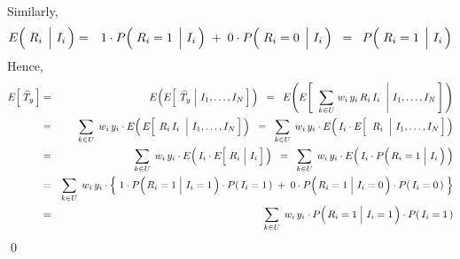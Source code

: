 Similarly,
\begin{eqnarray*}
E\!\left(\,\left.\overset{{\color{white}.}}{R_{i}}\;\,\right\vert\,I_{i}\,\right)
& = &
	1 \cdot P\!\left(\,\left.\overset{{\color{white}.}}{R_{i}}=1\;\,\right\vert\,I_{i}\,\right)
	\; + \;
	0 \cdot P\!\left(\,\left.\overset{{\color{white}.}}{R_{i}}=0\;\,\right\vert\,I_{i}\,\right)
\;\; = \;\;
	P\!\left(\,\left.\overset{{\color{white}.}}{R_{i}}=1\;\,\right\vert\,I_{i}\,\right)
\end{eqnarray*}
Hence,
\begin{eqnarray*}
E\!\left[\;\widehat{T}_{y}\,\right]
& = &
	E\!\left(E\!\left[\;\left.\widehat{T}_{y}\;\right\vert\,I_{1},\ldots,I_{N}\,\right]\,\right)
\;\; = \;\;
	E\!\left(E\!\left[\;\,\left.
		\underset{k \in U}{\sum}\;w_{i}\,y_{i}\,R_{i}\,I_{i}
		\;\;\right\vert\,I_{1},\ldots,I_{N}\,\right]\,\right)
\\
& = &
	\underset{k \in U}{\sum}\;\,w_{i}\,y_{i}
	\cdot
	E\!\left(\,E\!\left[\;\left.\overset{{\color{white}.}}{R_{i}\,I_{i}}\;\;\right\vert\,I_{1},\ldots,I_{N}\,\right]\,\right)
\;\; = \;\;
	\underset{k \in U}{\sum}\;\,w_{i}\,y_{i}
	\cdot
	E\!\left(\,I_{i} \cdot E\!\left[\;\left.\,\overset{{\color{white}.}}{R_{i}}\;\;\right\vert\,I_{1},\ldots,I_{N}\,\right]\,\right)
\\
& = &
	\underset{k \in U}{\sum}\;\,w_{i}\,y_{i}
	\cdot
	E\!\left(\,I_{i} \cdot E\!\left[\,\left.\overset{{\color{white}.}}{R_{i}}\;\right\vert\,I_{i}\,\right]\,\right)
\;\; = \;\;
	\underset{k \in U}{\sum}\;\,w_{i}\,y_{i}
	\cdot
	E\!\left(\,I_{i} \cdot P\!\left(\left.\overset{{\color{white}.}}{R_{i}}=1\;\right\vert\,I_{i}\,\right)\,\right)
\\
& = &
	\underset{k \in U}{\sum}\;\,w_{i}\,y_{i}
	\cdot
	\left\{\;
		1 \cdot P\!\left(\left.\overset{{\color{white}.}}{R_{i}}=1\;\right\vert\,I_{i}=1\,\right) \cdot P(\,I_{i}=1\,)
		\; + \;
		0 \cdot P\!\left(\left.\overset{{\color{white}.}}{R_{i}}=1\;\right\vert\,I_{i}=0\,\right) \cdot P(\,I_{i}=0\,)
		\;\right\}
\\
& = &
	\underset{k \in U}{\sum}\;\,w_{i}\,y_{i}
	\cdot P\!\left(\left.\overset{{\color{white}.}}{R_{i}}=1\;\right\vert\,I_{i}=1\,\right) \cdot P(\,I_{i}=1\,)
\end{eqnarray*}
\qed

